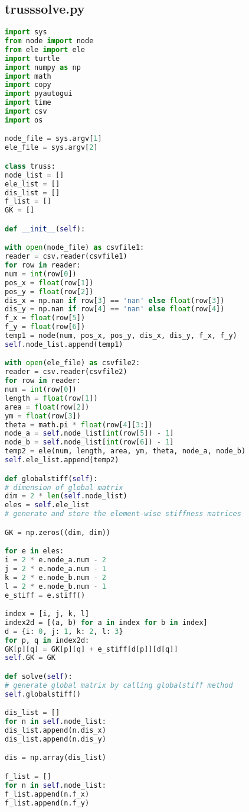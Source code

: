 \subsection*{trusssolve.py}
\begin{lstlisting}[language=Python , basicstyle=\linespread{0.75}\listingsfont]
import sys
from node import node
from ele import ele
import turtle
import numpy as np
import math
import copy
import pyautogui
import time
import csv
import os

node_file = sys.argv[1] 
ele_file = sys.argv[2]

class truss:
node_list = []
ele_list = []
dis_list = []
f_list = []
GK = []

def __init__(self):

with open(node_file) as csvfile1:
reader = csv.reader(csvfile1)
for row in reader:
num = int(row[0])
pos_x = float(row[1])
pos_y = float(row[2])
dis_x = np.nan if row[3] == 'nan' else float(row[3])
dis_y = np.nan if row[4] == 'nan' else float(row[4])
f_x = float(row[5])
f_y = float(row[6])
temp1 = node(num, pos_x, pos_y, dis_x, dis_y, f_x, f_y)
self.node_list.append(temp1)

with open(ele_file) as csvfile2:
reader = csv.reader(csvfile2)
for row in reader:
num = int(row[0])
length = float(row[1])
area = float(row[2])
ym = float(row[3])
theta = math.pi * float(row[4][3:])
node_a = self.node_list[int(row[5]) - 1]
node_b = self.node_list[int(row[6]) - 1]
temp2 = ele(num, length, area, ym, theta, node_a, node_b)
self.ele_list.append(temp2)

def globalstiff(self):
# dimension of global matrix
dim = 2 * len(self.node_list)
eles = self.ele_list
# generate and store the element-wise stiffness matrices

GK = np.zeros((dim, dim))

for e in eles:
i = 2 * e.node_a.num - 2
j = 2 * e.node_a.num - 1
k = 2 * e.node_b.num - 2
l = 2 * e.node_b.num - 1
e_stiff = e.stiff()

index = [i, j, k, l]
index2d = [(a, b) for a in index for b in index]
d = {i: 0, j: 1, k: 2, l: 3}
for p, q in index2d:
GK[p][q] = GK[p][q] + e_stiff[d[p]][d[q]]
self.GK = GK

def solve(self):
# generate global matrix by calling globalstiff method
self.globalstiff()

dis_list = []
for n in self.node_list:
dis_list.append(n.dis_x)
dis_list.append(n.dis_y)

dis = np.array(dis_list)

f_list = []
for n in self.node_list:
f_list.append(n.f_x)
f_list.append(n.f_y)


\end{lstlisting}
